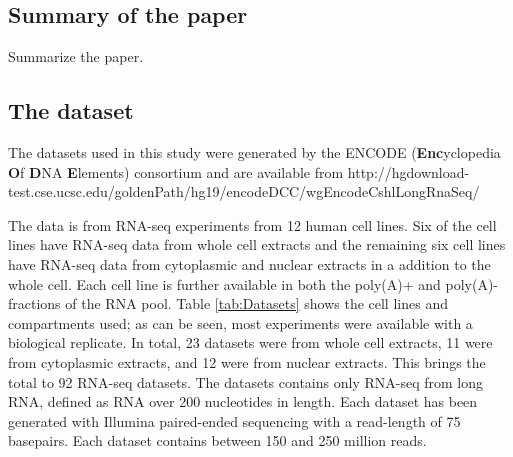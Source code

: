 %








\subsection{Summary of the paper}
Summarize the paper.

\subsection{The dataset}
The datasets used in this study were generated by the ENCODE
(\textbf{Enc}yclopedia \textbf{O}f \textbf{D}NA \textbf{E}lements) consortium
and are available from http://hgdownload-test.cse.ucsc.edu/goldenPath/hg19/encodeDCC/wgEncodeCshlLongRnaSeq/

The data is from RNA-seq experiments from 12 human cell lines. Six of the cell
lines have RNA-seq data from whole cell extracts and the remaining six cell
lines have RNA-seq data from cytoplasmic and nuclear extracts in a addition to
the whole cell. Each cell line is further available in both the poly(A)+ and
poly(A)- fractions of the RNA pool. Table \ref{tab:Datasets} shows the cell
lines and compartments used; as can be seen, most experiments were available
with a biological replicate. In total, 23 datasets were from whole cell
extracts, 11 were from cytoplasmic extracts, and 12 were from nuclear extracts.
This brings the total to 92 RNA-seq datasets. The datasets contains only
RNA-seq from long RNA, defined as RNA over 200 nucleotides in length. Each
dataset has been generated with Illumina paired-ended sequencing with a
read-length of 75 basepairs. Each dataset contains between 150 and 250 million
reads.

